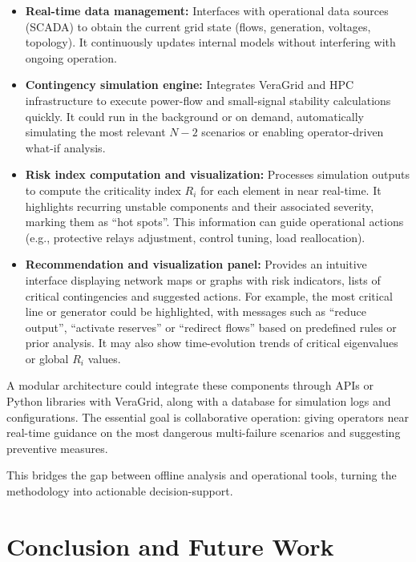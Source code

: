 \documentclass[journal]{IEEEtran}
\begin{document}
\begin{itemize}
    \item \textbf{Real-time data management:} Interfaces with operational data sources (SCADA) to obtain the current grid state (flows, generation, voltages, topology). It continuously updates internal models without interfering with ongoing operation.

    \item \textbf{Contingency simulation engine:} Integrates VeraGrid and HPC infrastructure to execute power-flow and small-signal stability calculations quickly. It could run in the background or on demand, automatically simulating the most relevant $N-2$ scenarios or enabling operator-driven what-if analysis.

    \item \textbf{Risk index computation and visualization:} Processes simulation outputs to compute the criticality index $R_i$ for each element in near real-time. It highlights recurring unstable components and their associated severity, marking them as “hot spots”. This information can guide operational actions (e.g., protective relays adjustment, control tuning, load reallocation).

    \item \textbf{Recommendation and visualization panel:} Provides an intuitive interface displaying network maps or graphs with risk indicators, lists of critical contingencies and suggested actions. For example, the most critical line or generator could be highlighted, with messages such as “reduce output”, “activate reserves” or “redirect flows” based on predefined rules or prior analysis. It may also show time-evolution trends of critical eigenvalues or global $R_i$ values.
\end{itemize}

A modular architecture could integrate these components through APIs or Python libraries with VeraGrid, along with a database for simulation logs and configurations. The essential goal is collaborative operation: giving operators near real-time guidance on the most dangerous multi-failure scenarios and suggesting preventive measures.

This bridges the gap between offline analysis and operational tools, turning the methodology into actionable decision-support.





\section{Conclusion and Future Work}
\label{conclusion}
\end{document}
